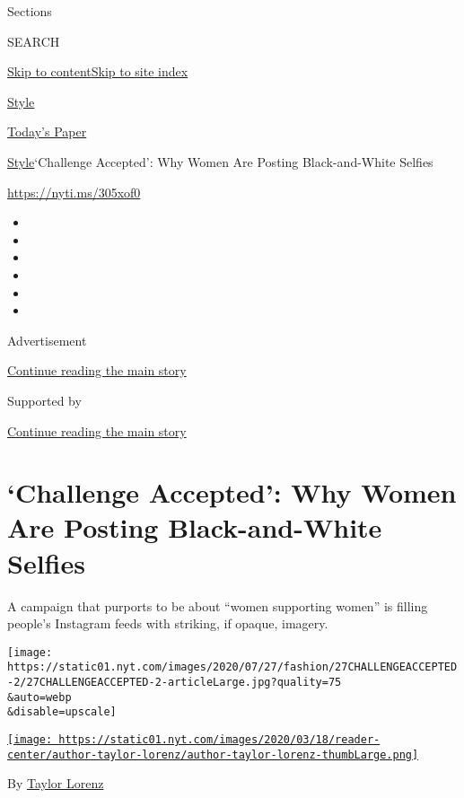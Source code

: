 Sections

SEARCH

\protect\hyperlink{site-content}{Skip to
content}\protect\hyperlink{site-index}{Skip to site index}

\href{https://www.nytimes.com/section/style}{Style}

\href{https://myaccount.nytimes.com/auth/login?response_type=cookie\&client_id=vi}{}

\href{https://www.nytimes.com/section/todayspaper}{Today's Paper}

\href{/section/style}{Style}\textbar{}`Challenge Accepted': Why Women
Are Posting Black-and-White Selfies

\url{https://nyti.ms/305xof0}

\begin{itemize}
\item
\item
\item
\item
\item
\item
\end{itemize}

Advertisement

\protect\hyperlink{after-top}{Continue reading the main story}

Supported by

\protect\hyperlink{after-sponsor}{Continue reading the main story}

\hypertarget{challenge-accepted-why-women-are-posting-black-and-white-selfies}{%
\section{`Challenge Accepted': Why Women Are Posting Black-and-White
Selfies}\label{challenge-accepted-why-women-are-posting-black-and-white-selfies}}

A campaign that purports to be about ``women supporting women'' is
filling people's Instagram feeds with striking, if opaque, imagery.

\texttt{[image: https://static01.nyt.com/images/2020/07/27/fashion/27CHALLENGEACCEPTED-2/27CHALLENGEACCEPTED-2-articleLarge.jpg?quality=75\\\&auto=webp\\\&disable=upscale]}

\href{https://www.nytimes.com/by/taylor-lorenz}{\texttt{[image: https://static01.nyt.com/images/2020/03/18/reader-center/author-taylor-lorenz/author-taylor-lorenz-thumbLarge.png]}}

By \href{https://www.nytimes.com/by/taylor-lorenz}{Taylor Lorenz}

